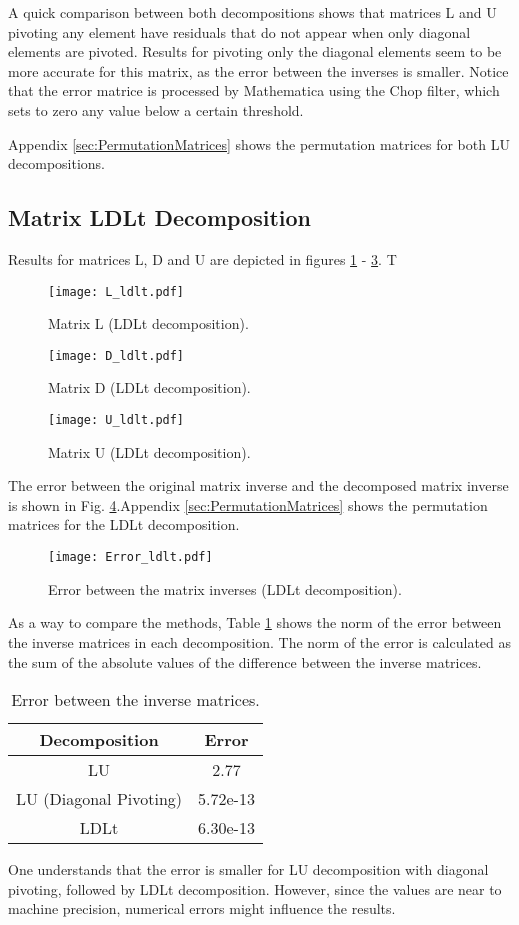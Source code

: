 A quick comparison between both decompositions shows that matrices L and U pivoting any element have residuals that do not appear when only diagonal elements are pivoted. Results for pivoting only the diagonal elements seem to be more accurate for this matrix, as the error between the inverses is smaller. Notice that the error matrice is processed by Mathematica using the Chop filter, which sets to zero any value below a certain threshold.

Appendix \ref{sec:PermutationMatrices} shows the permutation matrices for both LU decompositions. 

\subsection{Matrix LDLt Decomposition} \label{sec:ldlt}
Results for matrices L, D and U are depicted in figures \ref{fig:ldlt_L} - \ref{fig:ldlt_U}. T
\begin{figure}[H]
    \centering
    \texttt{[image: L\_ldlt.pdf]}
    \caption{Matrix L (LDLt decomposition).}
    \label{fig:ldlt_L}
\end{figure}
\begin{figure}[H]
    \centering
    \texttt{[image: D\_ldlt.pdf]}
    \caption{Matrix D (LDLt decomposition).}
    \label{fig:ldlt_D}
\end{figure}
\begin{figure}[H]
    \centering
    \texttt{[image: U\_ldlt.pdf]}
    \caption{Matrix U (LDLt decomposition).}
    \label{fig:ldlt_U}
\end{figure}

The error between the original matrix inverse and the decomposed matrix inverse is shown in Fig. \ref{fig:ldlt_inverse_error}.Appendix \ref{sec:PermutationMatrices} shows the permutation matrices for the LDLt decomposition.
\begin{figure}[H]
    \centering
    \texttt{[image: Error\_ldlt.pdf]}
    \caption{Error between the matrix inverses (LDLt decomposition).}
    \label{fig:ldlt_inverse_error}
\end{figure}

As a way to compare the methods, Table \ref{tab:error} shows the norm of the error between the inverse matrices in each decomposition. The norm of the error is calculated as the sum of the absolute values of the difference between the inverse matrices. 
\begin{table}[H]
    \centering 
    \caption{Error between the inverse matrices.}
    \begin{tabular}{cc}
        \hline
        Decomposition & Error \\
        \hline
        LU & 2.77 \\ 
        LU (Diagonal Pivoting) & 5.72e-13 \\
        LDLt & 6.30e-13 \\ \hline
    \end{tabular}
    \label{tab:error}
\end{table}

One understands that the error is smaller for LU decomposition with diagonal pivoting, followed by LDLt decomposition. However, since the values are near to machine precision, numerical errors might influence the results.